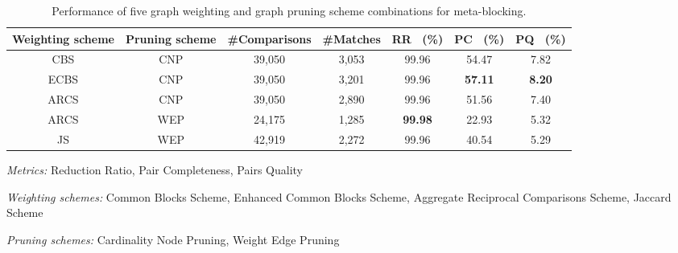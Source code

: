 


\begin{table}
   \caption{Performance of five graph weighting and graph pruning scheme combinations for meta-blocking.}
   \label{tab:evaluation}
   \begin{small}
   \begin{threeparttable}
   \begin{tabular}{ccccccc}
     \toprule
     Weighting scheme & Pruning scheme & \#Comparisons & \#Matches & RR\tnote{1} \ (\%) & PC\tnote{2} \ (\%) & PQ\tnote{3} \ (\%) \\
     \midrule
     CBS\tnote{4} & CNP\tnote{8} & 39,050 & 3,053 & 99.96 & 54.47 & 7.82\\
     ECBS\tnote{5} & CNP & 39,050 & 3,201 & 99.96 & \textbf{57.11} & \textbf{8.20}\\
     ARCS\tnote{6} & CNP & 39,050 & 2,890 & 99.96 & 51.56 & 7.40\\
     ARCS & WEP\tnote{9} & 24,175 & 1,285 & \textbf{99.98} & 22.93 & 5.32\\
     JS\tnote{7} & WEP & 42,919 & 2,272 & 99.96 & 40.54 & 5.29\\
   \bottomrule
 \end{tabular}
    \begin{footnotesize}
    \begin{tablenotes}
      \item[] \textit{Metrics:} \footnotemark[1]Reduction Ratio, \footnotemark[2]Pair Completeness, \footnotemark[3]Pairs Quality
      \item[] \textit{Weighting schemes:} \footnotemark[4]Common Blocks Scheme, \footnotemark[5]Enhanced Common Blocks Scheme, \footnotemark[6]Aggregate Reciprocal Comparisons Scheme, \footnotemark[7]Jaccard Scheme
      \item[] \textit{Pruning schemes:} \footnotemark[8]Cardinality Node Pruning, \footnotemark[9]Weight Edge Pruning
   \end{tablenotes}
   \end{footnotesize}
  \end{threeparttable}
  \end{small}
\end{table}

